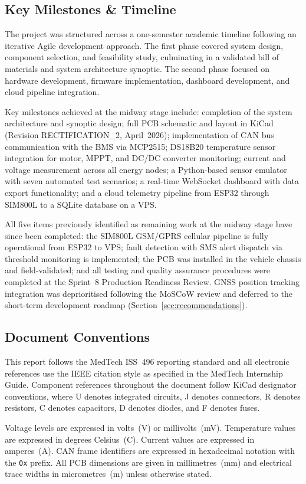 \subsection{Key Milestones \& Timeline}

The project was structured across a one-semester academic timeline following an iterative Agile development approach. The first phase covered system design, component selection, and feasibility study, culminating in a validated bill of materials and system architecture synoptic. The second phase focused on hardware development, firmware implementation, dashboard development, and cloud pipeline integration.

Key milestones achieved at the midway stage include: completion of the system architecture and synoptic design; full PCB schematic and layout in KiCad (Revision RECTIFICATION\_2, April~2026); implementation of CAN bus communication with the BMS via MCP2515; DS18B20 temperature sensor integration for motor, MPPT, and DC/DC converter monitoring; current and voltage measurement across all energy nodes; a Python-based sensor emulator with seven automated test scenarios; a real-time WebSocket dashboard with data export functionality; and a cloud telemetry pipeline from ESP32 through SIM800L to a SQLite database on a VPS.

All five items previously identified as remaining work at the midway stage have since been completed: the SIM800L GSM/GPRS cellular pipeline is fully operational from ESP32 to VPS; fault detection with SMS alert dispatch via threshold monitoring is implemented; the PCB was installed in the vehicle chassis and field-validated; and all testing and quality assurance procedures were completed at the Sprint~8 Production Readiness Review. GNSS position tracking integration was deprioritised following the MoSCoW review and deferred to the short-term development roadmap (Section~\ref{sec:recommendations}).

\subsection{Document Conventions}

This report follows the MedTech ISS~496 reporting standard and all electronic references use the IEEE citation style as specified in the MedTech Internship Guide. Component references throughout the document follow KiCad designator conventions, where U denotes integrated circuits, J denotes connectors, R denotes resistors, C denotes capacitors, D denotes diodes, and F denotes fuses.

Voltage levels are expressed in volts~(V) or millivolts~(mV). Temperature values are expressed in degrees Celsius~(\textdegree{}C). Current values are expressed in amperes~(A). CAN frame identifiers are expressed in hexadecimal notation with the \texttt{0x} prefix. All PCB dimensions are given in millimetres~(mm) and electrical trace widths in micrometres~(\textmu{}m) unless otherwise stated.
